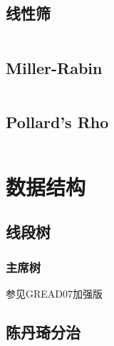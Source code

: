 \documentclass[a4paper]{article}
\begin{document}
\begin{multicols}{2}
			\subsection{线性筛}
				\inputminted{cpp}{../src/numbertheory/扩展线性筛.cpp}



			\subsection{Miller-Rabin}
				\inputminted{cpp}{../src/numbertheory/Miller-Rabin.cpp}

			\subsection{Pollard's Rho}
				\inputminted{cpp}{../src/numbertheory/Pollard's Rho.cpp}
			


				

		\section{数据结构}

			\subsection{线段树}

				\subsubsection{主席树}
					参见GREAD07加强版

			\subsection{陈丹琦分治}
				\inputminted{cpp}{../src/datastructure/CDQ分治.cpp}


\end{multicols}
\end{document}
